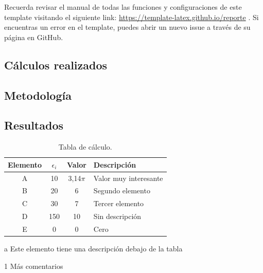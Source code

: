 	Recuerda revisar el manual de todas las funciones y configuraciones de este template visitando el siguiente link: \url{https://template-latex.github.io/reporte} \cite{template}. Si encuentras un error en el template, puedes abrir un nuevo issue a través de su página en GitHub.


\clearpage



\begin{appendixd}

	\section{Cálculos realizados}

	\subsection{Metodología}
	\lipsum[1]


	\subsection{Resultados}
	\lipsum[10]

	\enabletablerowcolor[2] %
	\begin{table}[H]
		\begin{threeparttable}
		\centering
		\caption{Tabla de cálculo.}
		\begin{tabular}{cccC{4cm}}
			\hline
			\textbf{Elemento} & $\epsilon_i$ & \textbf{Valor} & \textbf{Descripción} \bigstrut \\
			\hline
			A     & 10    & 3,14$\pi$ & Valor muy interesante \\
			B     & 20    & 6 & Segundo elemento \\
			C     & 30    & 7 & Tercer elemento \\
			D     & 150    & 10 & Sin descripción \\
			E     & 0    & 0 & Cero \\
			\hline
			\end{tabular}
		\begin{tablenotes}
			\item[a] Este elemento tiene una descripción debajo de la tabla
			\item[1] Más comentarios
		\end{tablenotes}
		\end{threeparttable}
		\label{tab:anexo-1}
	\end{table}
	\disabletablerowcolor %
	

\end{appendixd}

